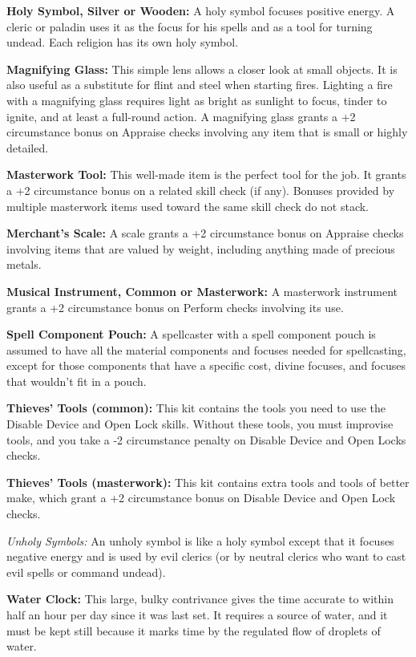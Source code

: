 \textbf{Holy Symbol, Silver or Wooden:} A holy symbol focuses positive energy. 
A cleric or paladin uses it as the focus for his spells and as a tool for turning 
undead. Each religion has its own holy symbol.

\textbf{Magnifying Glass:} This simple lens allows a closer look at small objects. 
It is also useful as a substitute for flint and steel when starting fires. Lighting 
a fire with a magnifying glass requires light as bright as sunlight to focus, tinder 
to ignite, and at least a full-round action. A magnifying glass grants a +2 circumstance 
bonus on Appraise checks involving any item that is small or highly detailed.

\textbf{Masterwork Tool:} This well-made item is the perfect tool for the job. 
It grants a +2 circumstance bonus on a related skill check (if any). Bonuses provided 
by multiple masterwork items used toward the same skill check do not stack.

\textbf{Merchant's Scale:} A scale grants a +2 circumstance bonus on Appraise 
checks involving items that are valued by weight, including anything made of precious 
metals.

\textbf{Musical Instrument, Common or Masterwork:} A masterwork instrument grants 
a +2 circumstance bonus on Perform checks involving its use.

\textbf{Spell Component Pouch:} A spellcaster with a spell component pouch is assumed 
to have all the material components and focuses needed for spellcasting, except 
for those components that have a specific cost, divine focuses, and focuses that 
wouldn't fit in a pouch.

\textbf{Thieves' Tools (common):} This kit contains the tools you need to use the Disable 
Device and Open Lock skills. Without these tools, you must improvise tools, and 
you take a -2 circumstance penalty on Disable Device and Open Locks checks.

\textbf{Thieves' Tools (masterwork):} This kit contains extra tools and tools of 
better make, which grant a +2 circumstance bonus on Disable Device and Open Lock 
checks.

\textit{Unholy Symbols:} An unholy symbol is like a holy symbol except that it 
focuses negative energy and is used by evil clerics (or by neutral clerics who 
want to cast evil spells or command undead).

\textbf{Water Clock:} This large, bulky contrivance gives the time accurate to 
within half an hour per day since it was last set. It requires a source of water, 
and it must be kept still because it marks time by the regulated flow of droplets 
of water.

